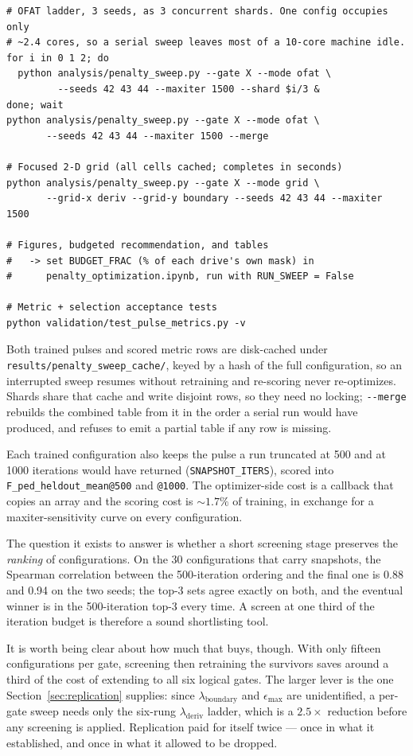 \documentclass[11pt]{article}
\newcommand{\lamd}{\lambda_{\mathrm{deriv}}}
\newcommand{\lamb}{\lambda_{\mathrm{boundary}}}
\begin{document}
\begin{lstlisting}
# OFAT ladder, 3 seeds, as 3 concurrent shards. One config occupies only
# ~2.4 cores, so a serial sweep leaves most of a 10-core machine idle.
for i in 0 1 2; do
  python analysis/penalty_sweep.py --gate X --mode ofat \
         --seeds 42 43 44 --maxiter 1500 --shard $i/3 &
done; wait
python analysis/penalty_sweep.py --gate X --mode ofat \
       --seeds 42 43 44 --maxiter 1500 --merge

# Focused 2-D grid (all cells cached; completes in seconds)
python analysis/penalty_sweep.py --gate X --mode grid \
       --grid-x deriv --grid-y boundary --seeds 42 43 44 --maxiter 1500

# Figures, budgeted recommendation, and tables
#   -> set BUDGET_FRAC (% of each drive's own mask) in
#      penalty_optimization.ipynb, run with RUN_SWEEP = False

# Metric + selection acceptance tests
python validation/test_pulse_metrics.py -v
\end{lstlisting}

Both trained pulses and scored metric rows are disk-cached under
\texttt{results/penalty\_sweep\_cache/}, keyed by a hash of the full configuration, so an
interrupted sweep resumes without retraining and re-scoring never re-optimizes. Shards share
that cache and write disjoint rows, so they need no locking; \texttt{-{}-merge} rebuilds the
combined table from it in the order a serial run would have produced, and refuses to emit a
partial table if any row is missing.

Each trained configuration also keeps the pulse a run truncated at 500 and at 1000 iterations
would have returned (\texttt{SNAPSHOT\_ITERS}), scored into \texttt{F\_ped\_heldout\_mean@500}
and \texttt{@1000}. The optimizer-side cost is a callback that copies an array and the scoring
cost is $\sim\!1.7\%$ of training, in exchange for a maxiter-sensitivity curve on every
configuration.

The question it exists to answer is whether a short screening stage preserves the \emph{ranking}
of configurations. On the 30 configurations that carry snapshots, the Spearman correlation
between the 500-iteration ordering and the final one is \num{0.88} and \num{0.94} on the two
seeds; the top-3 sets agree exactly on both, and the eventual winner is in the 500-iteration
top-3 every time. A screen at one third of the iteration budget is therefore a sound shortlisting
tool.

It is worth being clear about how much that buys, though. With only fifteen configurations per
gate, screening then retraining the survivors saves around a third of the cost of extending to
all six logical gates. The larger lever is the one Section~\ref{sec:replication} supplies: since
$\lamb$ and $\epsilon_{\max}$ are unidentified, a per-gate sweep needs only the six-rung $\lamd$
ladder, which is a $2.5\times$ reduction before any screening is applied. Replication paid for
itself twice --- once in what it established, and once in what it allowed to be dropped.
\end{document}
